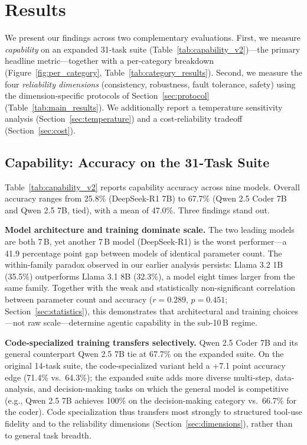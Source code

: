 
\section{Results}

We present our findings across two complementary evaluations. First, we measure \emph{capability} on an expanded 31-task suite (Table~\ref{tab:capability_v2})---the primary headline metric---together with a per-category breakdown (Figure~\ref{fig:per_category}, Table~\ref{tab:category_results}). Second, we measure the four \emph{reliability dimensions} (consistency, robustness, fault tolerance, safety) using the dimension-specific protocols of Section~\ref{sec:protocol} (Table~\ref{tab:main_results}). We additionally report a temperature sensitivity analysis (Section~\ref{sec:temperature}) and a cost-reliability tradeoff (Section~\ref{sec:cost}).




\subsection{Capability: Accuracy on the 31-Task Suite}

Table~\ref{tab:capability_v2} reports capability accuracy across nine models. Overall accuracy ranges from 25.8\% (DeepSeek-R1 7B) to 67.7\% (Qwen 2.5 Coder 7B and Qwen 2.5 7B, tied), with a mean of 47.0\%. Three findings stand out.

\textbf{Model architecture and training dominate scale.} The two leading models are both 7\,B, yet another 7\,B model (DeepSeek-R1) is the worst performer---a 41.9 percentage point gap between models of identical parameter count. The within-family paradox observed in our earlier analysis persists: Llama 3.2 1B (35.5\%) outperforms Llama 3.1 8B (32.3\%), a model eight times larger from the same family. Together with the weak and statistically non-significant correlation between parameter count and accuracy ($r = 0.289$, $p = 0.451$; Section~\ref{sec:statistics}), this demonstrates that architectural and training choices---not raw scale---determine agentic capability in the sub-10\,B regime.

\textbf{Code-specialized training transfers selectively.} Qwen 2.5 Coder 7B and its general counterpart Qwen 2.5 7B tie at 67.7\% on the expanded suite. On the original 14-task suite, the code-specialized variant held a +7.1 point accuracy edge (71.4\% vs.\ 64.3\%); the expanded suite adds more diverse multi-step, data-analysis, and decision-making tasks on which the general model is competitive (e.g., Qwen 2.5 7B achieves 100\% on the decision-making category vs.\ 66.7\% for the coder). Code specialization thus transfers most strongly to structured tool-use fidelity and to the reliability dimensions (Section~\ref{sec:dimensions}), rather than to general task breadth.

